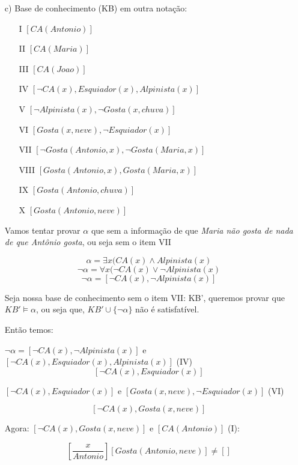 \documentclass{article}
\begin{document}
\begin{enumerate}
\begin{itemize}
        \item [c)] Base de conhecimento (KB) em outra notação:
        
            \begin{itemize}
                \item [I] $[CA (Antonio)]$
                \item [II] $[CA (Maria)]$
                \item [III] $[CA (Joao)]$
                \item [IV] $[\neg CA(x), Esquiador(x), Alpinista(x)]$
                \item [V] $[\neg Alpinista(x), \neg Gosta(x, chuva)]$
                \item [VI] $[Gosta(x, neve), \neg Esquiador (x)]$
                \item [VII] $[\neg Gosta (Antonio,x), \neg Gosta (Maria,x)]$
                \item [VIII] $[Gosta (Antonio,x), Gosta (Maria,x)]$
                \item [IX] $[Gosta(Antonio, chuva)]$
                \item [X] $[Gosta(Antonio, neve)]$

            \end{itemize}
        
        Vamos tentar provar $\alpha$ que sem a informação de que \textit{Maria não gosta de nada de que Antônio gosta},
        ou seja sem o item VII

        $$\alpha = \exists x (CA(x) \land Alpinista(x)$$
        $$\neg \alpha = \forall x (\neg CA(x) \lor \neg Alpinista(x)$$
        $$\neg \alpha = [\neg CA(x), \neg Alpinista(x)]$$

        Seja nossa base de conhecimento sem o item VII: KB', queremos provar que
        $KB' \vDash \alpha$, ou seja que, $KB' \cup \{\neg \alpha\}$ não é 
        satisfatível.

        Então temos:

        $\neg \alpha = [\neg CA(x), \neg Alpinista(x)]$ e $[\neg CA(x), Esquiador(x), Alpinista(x)]$ (IV)
        $$[\neg CA(x), Esquiador(x)]$$

        $[\neg CA(x), Esquiador(x)]$ e $[Gosta(x, neve), \neg Esquiador (x)]$ (VI)

        $$[\neg CA(x), Gosta(x, neve)]$$

        Agora: $[\neg CA(x), Gosta(x, neve)]$ e $[CA (Antonio)]$ (I):

        $$\left[\frac{x}{Antonio}\right][Gosta(Antonio, neve)] \neq []$$


\end{itemize}
\end{enumerate}
\end{document}
